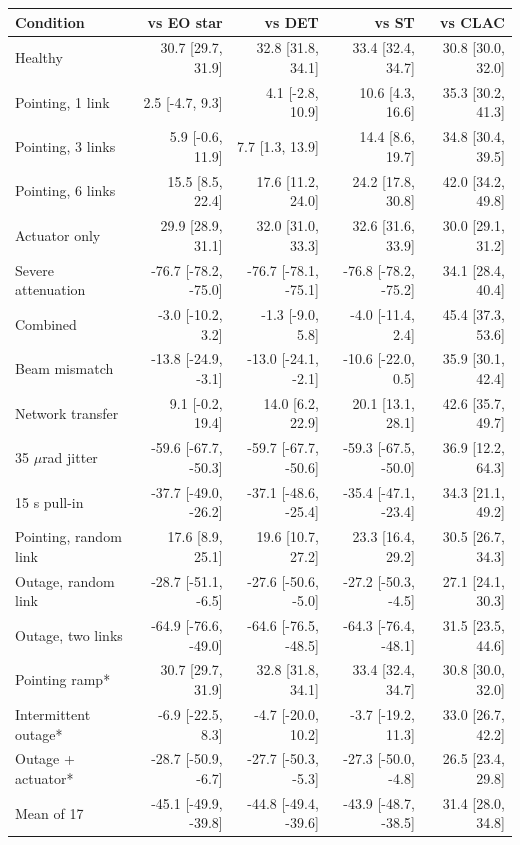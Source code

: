 \begin{tabular}{@{}lrrrr@{}}
\toprule
Condition & vs EO star & vs DET & vs ST & vs CLAC\\
\midrule
Healthy & 30.7 [29.7, 31.9] & 32.8 [31.8, 34.1] & 33.4 [32.4, 34.7] & 30.8 [30.0, 32.0]\\
Pointing, 1 link & 2.5 [-4.7, 9.3] & 4.1 [-2.8, 10.9] & 10.6 [4.3, 16.6] & 35.3 [30.2, 41.3]\\
Pointing, 3 links & 5.9 [-0.6, 11.9] & 7.7 [1.3, 13.9] & 14.4 [8.6, 19.7] & 34.8 [30.4, 39.5]\\
Pointing, 6 links & 15.5 [8.5, 22.4] & 17.6 [11.2, 24.0] & 24.2 [17.8, 30.8] & 42.0 [34.2, 49.8]\\
Actuator only & 29.9 [28.9, 31.1] & 32.0 [31.0, 33.3] & 32.6 [31.6, 33.9] & 30.0 [29.1, 31.2]\\
Severe attenuation & -76.7 [-78.2, -75.0] & -76.7 [-78.1, -75.1] & -76.8 [-78.2, -75.2] & 34.1 [28.4, 40.4]\\
Combined & -3.0 [-10.2, 3.2] & -1.3 [-9.0, 5.8] & -4.0 [-11.4, 2.4] & 45.4 [37.3, 53.6]\\
Beam mismatch & -13.8 [-24.9, -3.1] & -13.0 [-24.1, -2.1] & -10.6 [-22.0, 0.5] & 35.9 [30.1, 42.4]\\
Network transfer & 9.1 [-0.2, 19.4] & 14.0 [6.2, 22.9] & 20.1 [13.1, 28.1] & 42.6 [35.7, 49.7]\\
35 $\mu$rad jitter & -59.6 [-67.7, -50.3] & -59.7 [-67.7, -50.6] & -59.3 [-67.5, -50.0] & 36.9 [12.2, 64.3]\\
15 s pull-in & -37.7 [-49.0, -26.2] & -37.1 [-48.6, -25.4] & -35.4 [-47.1, -23.4] & 34.3 [21.1, 49.2]\\
Pointing, random link & 17.6 [8.9, 25.1] & 19.6 [10.7, 27.2] & 23.3 [16.4, 29.2] & 30.5 [26.7, 34.3]\\
Outage, random link & -28.7 [-51.1, -6.5] & -27.6 [-50.6, -5.0] & -27.2 [-50.3, -4.5] & 27.1 [24.1, 30.3]\\
Outage, two links & -64.9 [-76.6, -49.0] & -64.6 [-76.5, -48.5] & -64.3 [-76.4, -48.1] & 31.5 [23.5, 44.6]\\
Pointing ramp* & 30.7 [29.7, 31.9] & 32.8 [31.8, 34.1] & 33.4 [32.4, 34.7] & 30.8 [30.0, 32.0]\\
Intermittent outage* & -6.9 [-22.5, 8.3] & -4.7 [-20.0, 10.2] & -3.7 [-19.2, 11.3] & 33.0 [26.7, 42.2]\\
Outage + actuator* & -28.7 [-50.9, -6.7] & -27.7 [-50.3, -5.3] & -27.3 [-50.0, -4.8] & 26.5 [23.4, 29.8]\\
\midrule
Mean of 17 & -45.1 [-49.9, -39.8] & -44.8 [-49.4, -39.6] & -43.9 [-48.7, -38.5] & 31.4 [28.0, 34.8]\\
\bottomrule
\end{tabular}

